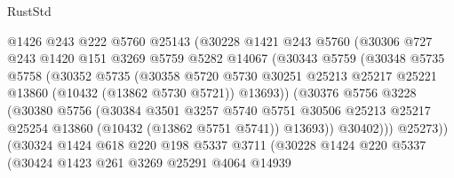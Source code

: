 \begin{lexlean}{RustStd}
\begin{coremodule}
                      @1426
                      @243
                      @222
                      @5760
                      @25143
                      (@30228
                        @1421
                        @243
                        @5760
                        (@30306
                          @727
                          @243
                          @1420
                          @151
                          @3269
                          @5759
                          @5282
                          @14067
                          (@30343
                            @5759
                            (@30348
                              @5735
                              @5758
                              (@30352
                                @5735
                                (@30358
                                  @5720
                                  @5730
                                  @30251
                                  @25213
                                  @25217
                                  @25221
                                  @13860
                                  (@10432 (@13862 @5730 @5721))
                                  @13693))
                              (@30376
                                @5756
                                @3228
                                (@30380
                                  @5756
                                  (@30384
                                    @3501
                                    @3257
                                    @5740
                                    @5751
                                    @30506
                                    @25213
                                    @25217
                                    @25254
                                    @13860
                                    (@10432 (@13862 @5751 @5741))
                                    @13693))
                                @30402)))
                          @25273))
                      (@30324
                        @1424
                        @618
                        @220
                        @198
                        @5337
                        @3711
                        (@30228
                          @1424
                          @220
                          @5337
                          (@30424
                            @1423
                            @261
                            @3269
                            @25291
                            @4064
                            @14939

\end{coremodule}
\end{lexlean}
